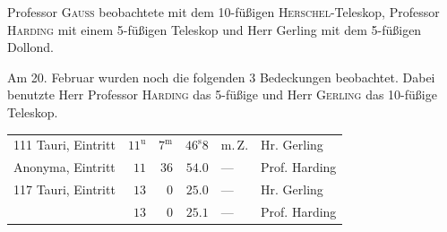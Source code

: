 \par\indent Professor \textsc{Gauß} beobachtete mit dem 10-füßigen \textsc{Herschel}-Teleskop, Professor \textsc{Harding} mit einem 5-füßigen Teleskop und Herr Gerling mit dem 5-füßigen Dollond.

\par\indent Am 20. Februar wurden noch die folgenden 3 Bedeckungen beobachtet. Dabei benutzte Herr Professor \textsc{Harding} das 5-füßige und Herr \textsc{Gerling} das 10-füßige Teleskop.

\begin{center}\fontsize{9}{11}\selectfont\setlength{\tabcolsep}{2.5pt}\renewcommand{\arraystretch}{1.15}\begin{tabular}{lrrrll}
111 Tauri, Eintritt & $11^{\mathrm u}$ & $7^{\mathrm m}$ & $46^{\mathrm s}8$ & m.\,Z. & Hr. Gerling\\
Anonyma, Eintritt & $11$ & $36$ & $54.0$ & — & Prof. Harding\\
117 Tauri, Eintritt & $13$ & $0$ & $25.0$ & — & Hr. Gerling\\
 & $13$ & $0$ & $25.1$ & — & Prof. Harding\\
\end{tabular}\end{center}
